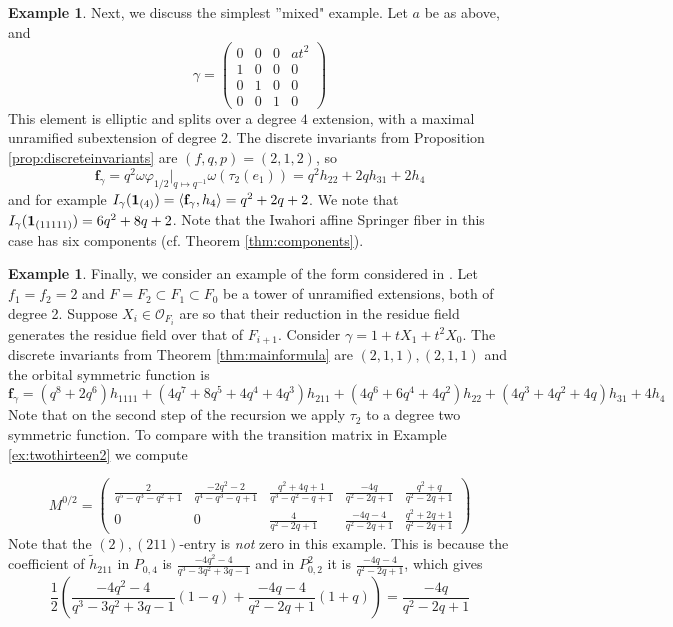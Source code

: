 \documentclass{amsart}
\numberwithin{equation}{section}
\theoremstyle{definition}
\newtheorem{example}[lemma]{Example}%
\def\16{{\bf 16}}
\def\1{{\bf 1}}
\def\tilde{\widetilde}
\renewcommand{\th}{\tilde{h}}
\newcommand{\fgamma}{\mathbf{f}_{\gamma}}
\newcommand{\cO}{\mathcal{O}}
\begin{document}
\begin{example}
Next, we discuss the simplest ''mixed" example. Let $a$ be as above, and $$\gamma=\begin{pmatrix}
    0 & 0 & 0 & at^2 \\
    1 & 0 & 0 & 0\\
    0 & 1 & 0 & 0 \\
    0 & 0 & 1 & 0
\end{pmatrix}$$
This element is elliptic and splits over a degree $4$ extension, with a maximal 
unramified subextension of degree $2$.
The discrete invariants from Proposition \ref{prop:discreteinvariants} are $(f,q,p)=(2,1,2)$, so 
$$\fgamma=q^2\omega \varphi_{1/2}|_{q\mapsto q^{-1}}\omega(\tau_2(e_1))=q^{2}h_{22} + 2 qh_{31} + 2h_{4}$$
and for example $I_\gamma(\1_{(4)})=\langle\fgamma,h_{4}\rangle =q^2+2q+2$. We note that $I_\gamma(\1_{(11111)})=6q^2+8q+2$. Note that the Iwahori affine Springer fiber in this case has six components (cf. Theorem \ref{thm:components}).
\end{example}
\begin{example}
Finally, we consider an example of the form considered in \cite[1.5.]{W1}. Let $f_1=f_2=2$ and $F=F_2\subset F_1\subset F_0$ be a tower of unramified extensions, both of degree 2. Suppose $X_i\in \cO_{F_i}$ are so that their reduction in the residue field generates the residue field over that of $F_{i+1}$. Consider $\gamma=1+tX_1+t^2X_0$. The discrete invariants from Theorem \ref{thm:mainformula} are $(2,1,1),(2,1,1)$ and the orbital symmetric function is 
$$
\fgamma=(q^{8} + 2 q^{6}) h_{1111} + (4 q^{7} + 8 q^{5} + 4 q^{4} + 4 q^{3}) h_{211} + (4 q^{6} + 6 q^{4} + 4 q^{2}) h_{22} + (4 q^{3} + 4 q^{2} + 4 q) h_{31} + 4 h_{4}
$$
Note that on the second step of the recursion we apply $\tau_2$ to a degree two symmetric function. To compare with the transition matrix in Example \ref{ex:twothirteen2} we compute

$$M^{0/2}=\left(\begin{array}{rrrrr}
\frac{2}{q^{5} - q^{3} - q^{2} + 1} & \frac{-2 q^{2} - 2}{q^{4} - q^{3} - q + 1} & \frac{q^{2} + 4 q + 1}{q^{3} - q^{2} - q + 1} & \frac{-4 q}{q^{2} - 2 q + 1} & \frac{q^{2} + q}{q^{2} - 2 q + 1} \\
0 & 0 & \frac{4}{q^{2} - 2 q + 1} & \frac{-4 q - 4}{q^{2} - 2 q + 1} & \frac{q^{2} + 2 q + 1}{q^{2} - 2 q + 1}
\end{array}\right)$$
Note that the $(2),(211)$-entry is {\em not} zero in this example.
This is because the coefficient of $\th_{211}$
in $P_{0,4}$ is $\frac{-4 q^{2} - 4}{q^{3} - 3 q^{2} + 3 q - 1}$ and in $P_{0,2}^2$ it is $\frac{-4 q - 4}{q^{2} - 2 q + 1}$, which gives
$$\frac{1}{2}\left(\frac{-4 q^{2} - 4}{q^{3} - 3 q^{2} + 3 q - 1}(1-q)+\frac{-4 q - 4}{q^{2} - 2 q + 1}(1+q)\right)=\frac{-4 q}{q^{2} - 2 q + 1}$$
\end{example}
\end{document}

